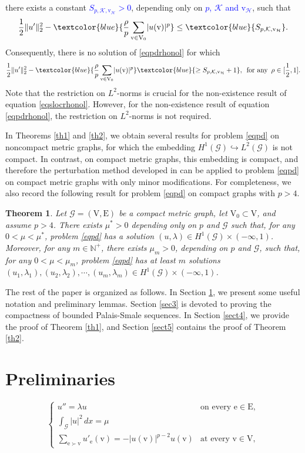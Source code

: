 \documentclass[11pt]{amsart}
\newtheorem{theorem}{Theorem}[section]
\newcommand{\abs}[1]{\lvert#1\rvert}
\newcommand{\norm}[1]{\lVert#1\rVert}
\newcommand{\blue}[1]{\textcolor{blue}{#1}}
\newcommand{\G}{\mathcal{G}}
\newcommand{\K}{\mathcal{K}}
\newcommand{\E}{\mathrm{E}}
\newcommand{\V}{\mathrm{V}}
\newcommand{\e}{\mathrm{e}}
\newcommand{\vv}{\mathrm{v}}
\numberwithin{equation}{section}
\begin{document}
there exists a constant  \blue{$S_{p,\K,\vv_\mathcal{H}} > 0$}, depending only on \blue{$p$, $\K$ and $\vv_\mathcal{H}$}, such that
$$\frac{1}{2}\norm{u'}^{2}_2-\blue{\frac{\rho}{p}\sum_{\vv \in \V_0}\abs{u(\vv)}^p} \leq  \blue{S_{p,\K,\vv_\mathcal{H}}}.$$
Consequently, there is no solution of \eqref{eqpdrhonol} for which  
$$\frac{1}{2}\norm{u'}^{2}_2-\blue{\frac{\rho}{p}\sum_{\vv \in \V_0}\abs{u(\vv)}^p} \blue{\geq S_{p,\K,\vv_\mathcal{H}}+1},\,\,\,\text{for any}\,\,\, \rho \in [\frac{1}{2},1].$$
Note that the restriction on $L^2$-norms is crucial for the non-existence result of equation \eqref{eqslocrhonol}. However, for the non-existence result of equation \eqref{eqpdrhonol},  the restriction on $L^2$-norms is not required.
\fi



In Theorems \ref{th1} and \ref{th2}, we obtain several results for problem \eqref{eqpd} on noncompact metric graphs, for which the embedding $H^1(\G) \hookrightarrow L^2(\G)$ is not compact.  In contrast, on compact metric graphs, this embedding is compact, and therefore the perturbation method developed in \cite[Section 5]{AHJ} can be applied to problem \eqref{eqpd} on compact metric graphs with only minor modifications.  For completeness, we also record the following result for problem \eqref{eqpd} on compact graphs with $p>4$.

\begin{theorem}
    Let $\G=(\V,\E)$ be a compact metric graph, let $\V_0\subset\V$, and assume $p>4$. There exists $\mu^*>0$ depending only on $p$ and $\G$ such that, for any $0<\mu<\mu^*$, problem \eqref{eqpd}
has a solution $(u,\lambda) \in H^{1}(\G)\times (-\infty,1)$. Moreover, for any $m \in \mathbb{N}^+$, there exists $\mu_{m}> 0$,  depending on $p$ and $\G$, such that, for any $0 < \mu < \mu_{m}$,  problem \eqref{eqpd} has at least $m$  solutions $(u_1,\lambda_1), (u_2,\lambda_2),\cdots,(u_{m},\lambda_m) \in H^{1}(\G)\times(-\infty,1)$.
\end{theorem}



The rest of the paper is organized as follows. In Section \ref{sect2}, we present some useful notation and preliminary lemmas. Section \ref{sec3} is devoted to proving  the compactness of bounded Palais-Smale sequences. In Section \ref{sect4}, we provide the proof of Theorem \ref{th1}, and Section \ref{sect5} contains the proof of Theorem \ref{th2}.
\section{Preliminaries}\label{sect2}
\iffalse
\begin{equation}\label{eqpd}
    \begin{cases} 
u'' = \lambda u & \text{on every }\e \in \E, \\ 
\int_\G\abs{u}^2\, dx = \mu & \\
\displaystyle\sum_{\e \succ \vv} u'_\e(\vv) = -|u(\vv)|^{p-2}u(\vv) & \text{at every } \vv \in \V,
\end{cases}
\end{equation}
\end{document}
